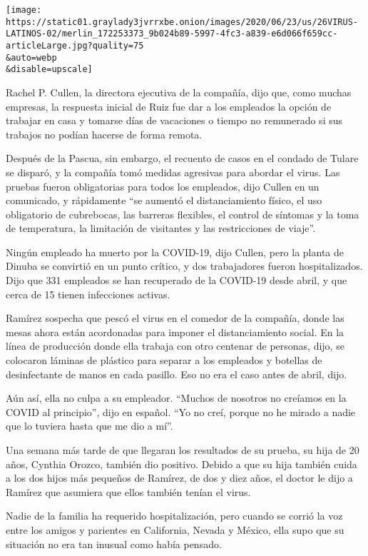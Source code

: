 \texttt{[image: https://static01.graylady3jvrrxbe.onion/images/2020/06/23/us/26VIRUS-LATINOS-02/merlin\_172253373\_9b024b89-5997-4fc3-a839-e6d066f659cc-articleLarge.jpg?quality=75\\\&auto=webp\\\&disable=upscale]}

Rachel P. Cullen, la directora ejecutiva de la compañía, dijo que, como
muchas empresas, la respuesta inicial de Ruiz fue dar a los empleados la
opción de trabajar en casa y tomarse días de vacaciones o tiempo no
remunerado si sus trabajos no podían hacerse de forma remota.

Después de la Pascua, sin embargo, el recuento de casos en el condado de
Tulare se disparó, y la compañía tomó medidas agresivas para abordar el
virus. Las pruebas fueron obligatorias para todos los empleados, dijo
Cullen en un comunicado, y rápidamente ``se aumentó el distanciamiento
físico, el uso obligatorio de cubrebocas, las barreras flexibles, el
control de síntomas y la toma de temperatura, la limitación de
visitantes y las restricciones de viaje''.

Ningún empleado ha muerto por la COVID-19, dijo Cullen, pero la planta
de Dinuba se convirtió en un punto crítico, y dos trabajadores fueron
hospitalizados. Dijo que 331 empleados se han recuperado de la COVID-19
desde abril, y que cerca de 15 tienen infecciones activas.

Ramírez sospecha que pescó el virus en el comedor de la compañía, donde
las mesas ahora están acordonadas para imponer el distanciamiento
social. En la línea de producción donde ella trabaja con otro centenar
de personas, dijo, se colocaron láminas de plástico para separar a los
empleados y botellas de desinfectante de manos en cada pasillo. Eso no
era el caso antes de abril, dijo.

Aún así, ella no culpa a su empleador. ``Muchos de nosotros no creíamos
en la COVID al principio'', dijo en español. ``Yo no creí, porque no he
mirado a nadie que lo tuviera hasta que me dio a mí''.

Una semana más tarde de que llegaran los resultados de su prueba, su
hija de 20 años, Cynthia Orozco, también dio positivo. Debido a que su
hija también cuida a los dos hijos más pequeños de Ramírez, de dos y
diez años, el doctor le dijo a Ramírez que asumiera que ellos también
tenían el virus.

Nadie de la familia ha requerido hospitalización, pero cuando se corrió
la voz entre los amigos y parientes en California, Nevada y México, ella
supo que su situación no era tan inusual como había pensado.

